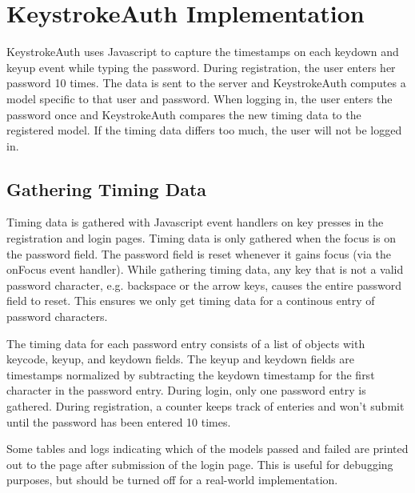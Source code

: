 \documentclass{article}
\begin{document}
\section{KeystrokeAuth Implementation}
KeystrokeAuth uses Javascript to capture the timestamps on each keydown and keyup event while typing the password.
During registration, the user enters her password 10 times.
The data is sent to the server and KeystrokeAuth computes a model specific to that user and password.
When logging in, the user enters the password once and KeystrokeAuth compares the new timing data to the registered model.
If the timing data differs too much, the user will not be logged in.

\subsection{Gathering Timing Data}
Timing data is gathered with Javascript event handlers on key presses in the registration and login pages.
Timing data is only gathered when the focus is on the password field. The password field is reset whenever it gains focus (via the onFocus event handler).  
While gathering timing data, any key that is not a valid password character, e.g. backspace or the arrow keys, causes the entire password field to reset.
This ensures we only get timing data for a continous entry of password characters.

The timing data for each password entry consists of a list of objects with keycode, keyup, and keydown fields. The keyup and keydown fields are timestamps normalized by subtracting the keydown timestamp for the first character in the password entry. 
During login, only one password entry is gathered. During registration, a counter keeps track of enteries and won't submit until the password has been entered 10 times.

Some tables and logs indicating which of the models passed and failed are printed out to the page after submission of the login page. 
This is useful for debugging purposes, but should be turned off for a real-world implementation.
\end{document}
